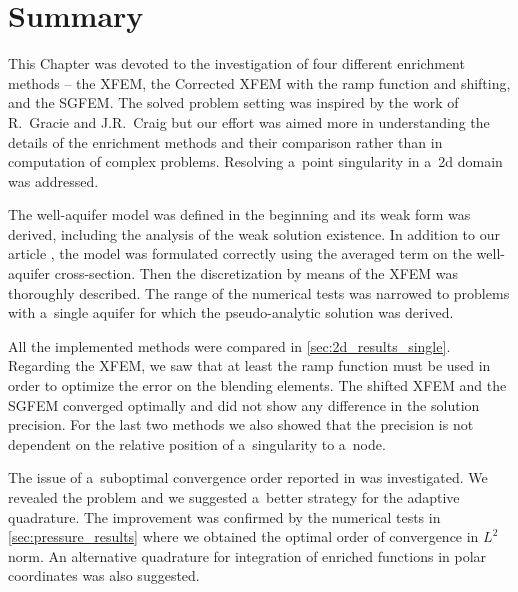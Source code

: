 \section{Summary}
\label{sec:summary}


This Chapter was devoted to the investigation of four different enrichment methods
-- the XFEM, the Corrected XFEM with the ramp function and shifting, and the SGFEM. 
The solved problem setting was inspired by the work \cite{gracie_modelling_2010,craig_using_2011} 
of R.~Gracie and J.R.~Craig but our effort was aimed more in understanding the details of the enrichment methods and their comparison
rather than in computation of complex problems. Resolving a~point singularity in a~2d domain was addressed.

The well-aquifer model was defined in the beginning and its weak form was derived, including the analysis of the weak solution existence.
In addition to our article \cite{exner_2016}, the model was formulated correctly using the averaged term on the well-aquifer
cross-section. Then the discretization by means of the XFEM was thoroughly described.
The range of the numerical tests was narrowed to problems with a~single aquifer for which the pseudo-analytic solution was derived.

All the implemented methods were compared in \ref{sec:2d_results_single}. Regarding the XFEM, we saw that at 
least the ramp function must be used in order to optimize the error on the blending elements. 
The shifted XFEM and the SGFEM converged optimally and did not show any difference in the solution precision.
For the last two methods we also showed that the precision is not dependent on the relative position of a~singularity to a~node.

The issue of a~suboptimal convergence order reported in \cite{gracie_modelling_2010} was investigated. 
We revealed the problem and we suggested a~better strategy for the adaptive quadrature. 
The improvement was confirmed by the numerical tests in \ref{sec:pressure_results} where we obtained the optimal 
order of convergence in $L^2$ norm.
An alternative quadrature for integration of enriched functions in polar coordinates was also suggested.

